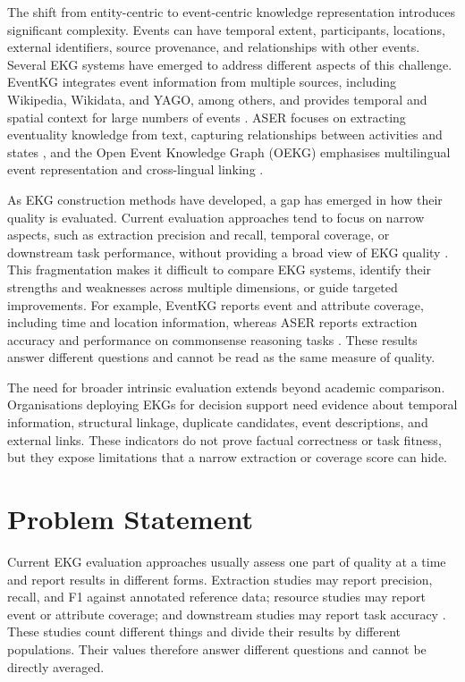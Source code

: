 The shift from entity-centric to event-centric knowledge representation introduces significant complexity. Events can have temporal extent, participants, locations, external identifiers, source provenance, and relationships with other events. Several EKG systems have emerged to address different aspects of this challenge. EventKG integrates event information from multiple sources, including Wikipedia, Wikidata, and YAGO, among others, and provides temporal and spatial context for large numbers of events \citep{eventkg2018}. ASER focuses on extracting eventuality knowledge from text, capturing relationships between activities and states \citep{aser2019}, and the Open Event Knowledge Graph (OEKG) emphasises multilingual event representation and cross-lingual linking \citep{oekg2023}.

As EKG construction methods have developed, a gap has emerged in how their quality is evaluated. Current evaluation approaches tend to focus on narrow aspects, such as extraction precision and recall, temporal coverage, or downstream task performance, without providing a broad view of EKG quality \citep{kgquality2021}. This fragmentation makes it difficult to compare EKG systems, identify their strengths and weaknesses across multiple dimensions, or guide targeted improvements. For example, EventKG reports event and attribute coverage, including time and location information, whereas ASER reports extraction accuracy and performance on commonsense reasoning tasks \citep{eventkg2018,aser2019}. These results answer different questions and cannot be read as the same measure of quality.

The need for broader intrinsic evaluation extends beyond academic comparison. Organisations deploying EKGs for decision support need evidence about temporal information, structural linkage, duplicate candidates, event descriptions, and external links. These indicators do not prove factual correctness or task fitness, but they expose limitations that a narrow extraction or coverage score can hide.

\section{Problem Statement}

Current EKG evaluation approaches usually assess one part of quality at a time and report results in different forms. Extraction studies may report precision, recall, and F1 against annotated reference data; resource studies may report event or attribute coverage; and downstream studies may report task accuracy \citep{eventkg2018,aser2019,chronographer2023}. These studies count different things and divide their results by different populations. Their values therefore answer different questions and cannot be directly averaged.

